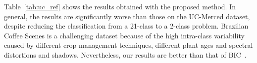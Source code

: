 \documentclass[journal]{IEEEtran}
\begin{document}
%

Table~\ref{tab:uc_ref} shows the results obtained with the proposed method. In general, the results are significantly worse than those on the UC-Merced dataset, despite reducing the classification from a 21-class to a 2-class problem. Brazilian Coffee Scenes is a challenging dataset because of the high intra-class variability caused by different crop management techniques, different plant ages and spectral distortions and shadows. Nevertheless, our results are better than that of BIC~\cite{penatti2015deep}.


\end{document}
